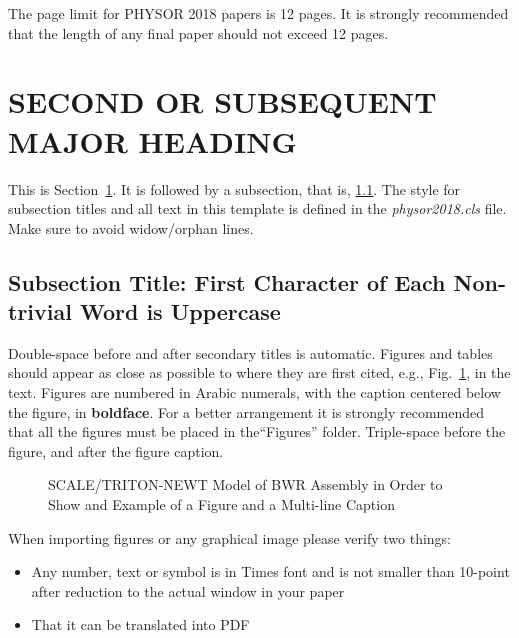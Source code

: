 \documentclass[letterpaper]{physor2018}
\begin{document}
The page limit for PHYSOR 2018 papers is 12 pages. It is strongly recommended that
the length of any final paper should not exceed 12 pages.

\section{SECOND OR SUBSEQUENT MAJOR HEADING}
\label{sec:first}

This is Section~\ref{sec:first}. It is followed by a subsection, that is,
\ref{sec:second}. The style for subsection titles and all text in this template is defined
in the \emph{physor2018.cls} file.  Make sure to avoid widow/orphan lines.

\subsection{Subsection Title: First Character of Each Non-trivial Word is Uppercase}
\label{sec:second}

Double-space before and after secondary titles is automatic.  Figures and
tables should appear as close as possible to where they are first
cited, e.g., Fig.~\ref{fig:amdahl}, in the text.  Figures are numbered in Arabic
numerals, with the caption centered below the figure, in \textbf{boldface}. For a better
arrangement it is strongly recommended that all the figures must be placed in the``Figures''
folder. Triple-space before the figure, and after the figure caption.

\begin{figure}[!htb]
  \centering
  \caption{SCALE/TRITON-NEWT Model of BWR Assembly in Order to Show and Example of a Figure and a Multi-line Caption}
  \label{fig:amdahl}
\end{figure}

When importing figures or any graphical image please verify two things:
\vspace{-0.65cm} %
\begin{itemize} \itemsep1pt \parskip0pt 
\item Any number, text or symbol is in Times font and is not smaller than
  10-point after reduction to the actual window in your paper
\item That it can be translated into PDF
\end{itemize}
\end{document}

